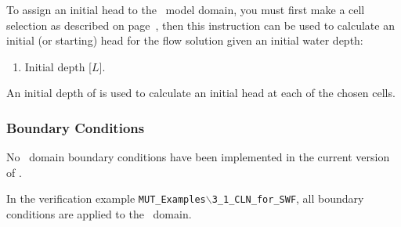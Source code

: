 To assign an initial head to the \cln\ model domain, you must first make a cell selection as described on page~\pageref{page:cellSelect}, then this instruction can be used to calculate an initial (or starting) head for the flow solution given an initial water depth:

    {
        \squish
        \begin{enumerate}
        \item {}  Initial depth [$L$].
        \end{enumerate}
          An initial depth of  is used to calculate an initial head at each of the chosen cells.
    }

\subsubsection{Boundary Conditions}  
No \cln\ domain boundary conditions have been implemented in the current version of \mut. 

In the verification example \texttt{MUT\_Examples$\backslash$3\_1\_CLN\_for\_SWF}, all boundary conditions are applied to the \gwf\ domain.


